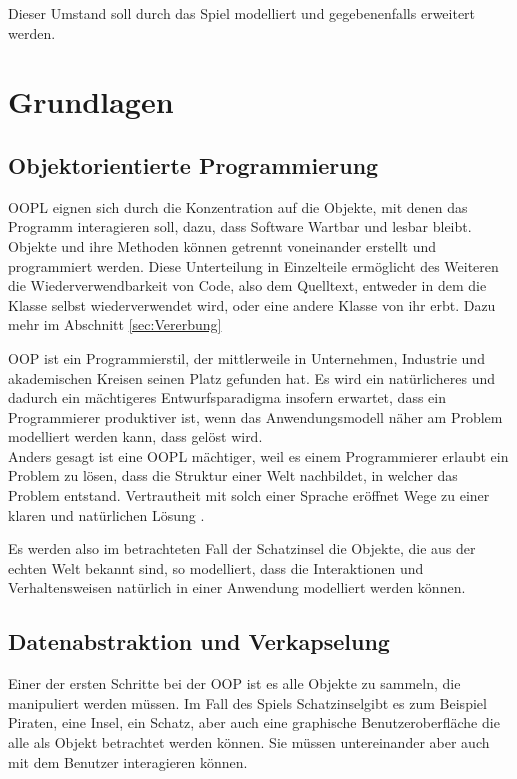 \documentclass[
	12pt, %
	a4paper,
	listof=totoc, %
	bibliography=totoc, %
	numbers=noenddot, %
	ngerman, %
	headsepline, %
	oneside %
	]{scrbook} %
\begin{document}
Dieser Umstand soll durch das Spiel modelliert und gegebenenfalls erweitert werden.

\chapter{Grundlagen}\label{sec:Grundlagen}
\section{Objektorientierte Programmierung}
\gls{OOPL} eignen sich durch die Konzentration auf die Objekte, mit denen das Programm interagieren soll, dazu, dass Software Wartbar und lesbar bleibt. Objekte und ihre Methoden können getrennt voneinander erstellt und programmiert werden. Diese Unterteilung in Einzelteile ermöglicht des Weiteren die Wiederverwendbarkeit von Code, also dem Quelltext, entweder in dem die Klasse selbst wiederverwendet wird, oder eine andere Klasse von ihr erbt. Dazu mehr im Abschnitt \ref{sec:Vererbung}

\gls{OOP} ist ein Programmierstil, der mittlerweile in Unternehmen, Industrie und akademischen Kreisen seinen Platz gefunden hat. Es wird ein natürlicheres und dadurch ein mächtigeres Entwurfsparadigma insofern erwartet, dass ein Programmierer produktiver ist, wenn das Anwendungsmodell näher am Problem modelliert werden kann, dass gelöst wird.\\
Anders gesagt ist eine \gls{OOPL} mächtiger, weil es einem Programmierer erlaubt ein Problem zu lösen, dass die Struktur einer Welt nachbildet, in welcher das Problem entstand. Vertrautheit mit solch einer Sprache eröffnet Wege zu einer klaren und natürlichen Lösung \cite{OOPL}.

Es werden also im betrachteten Fall der Schatzinsel die Objekte, die aus der echten Welt bekannt sind, so modelliert, dass die Interaktionen und Verhaltensweisen natürlich in einer Anwendung modelliert werden können.

\section{Datenabstraktion und Verkapselung}
Einer der ersten Schritte bei der \gls{OOP} ist es alle Objekte zu sammeln, die manipuliert werden müssen. Im Fall des Spiels \glqq Schatzinsel\grqq \hspace{0.1cm}gibt es zum Beispiel Piraten, eine Insel, ein Schatz, aber auch eine graphische Benutzeroberfläche die alle als Objekt betrachtet werden können. Sie müssen untereinander aber auch mit dem Benutzer interagieren können.
\end{document}
